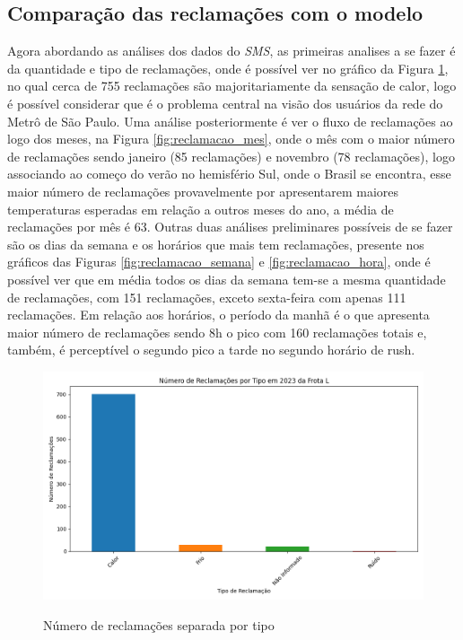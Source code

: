 \documentclass[acronym,symbols,table]{fei}
\begin{document}
\newpage

\subsection{Comparação das reclamações com o modelo}

Agora abordando as análises dos dados do \textit{SMS}, as primeiras analises a se fazer é da quantidade e tipo de reclamações, onde é possível ver no gráfico da Figura \ref{fig:reclamacao_tipo}, no qual cerca de 755 reclamações são majoritariamente da sensação de calor, logo é possível considerar que é o problema central na visão dos usuários da rede do Metrô de São Paulo. Uma análise posteriormente é ver o fluxo de reclamações ao logo dos meses, na Figura \ref{fig:reclamacao_mes}, onde o mês com o maior número de reclamações sendo janeiro (85 reclamações) e novembro (78 reclamações), logo associando ao começo do verão no hemisfério Sul, onde o Brasil se encontra, esse maior número de reclamações provavelmente por apresentarem maiores temperaturas esperadas em relação a outros meses do ano, a média de reclamações por mês é 63. Outras duas análises preliminares possíveis de se fazer são os dias da semana e os horários que mais tem reclamações, presente nos gráficos das Figuras \ref{fig:reclamacao_semana} e \ref{fig:reclamacao_hora}, onde é possível ver que em média todos os dias da semana tem-se a mesma quantidade de reclamações, com 151 reclamações, exceto sexta-feira com apenas 111 reclamações. Em relação aos horários, o período da manhã é o que apresenta maior número de reclamações sendo 8h o pico com 160 reclamações totais e, também, é perceptível o segundo pico a tarde no segundo horário de rush.

\begin{figure}[!htb]
    \centering
    \caption{Número de reclamações separada por tipo}
    \includegraphics[width=0.7\linewidth]{Imagens/reclamacao_tipo.png}
    \label{fig:reclamacao_tipo}
\end{figure}
\end{document}
